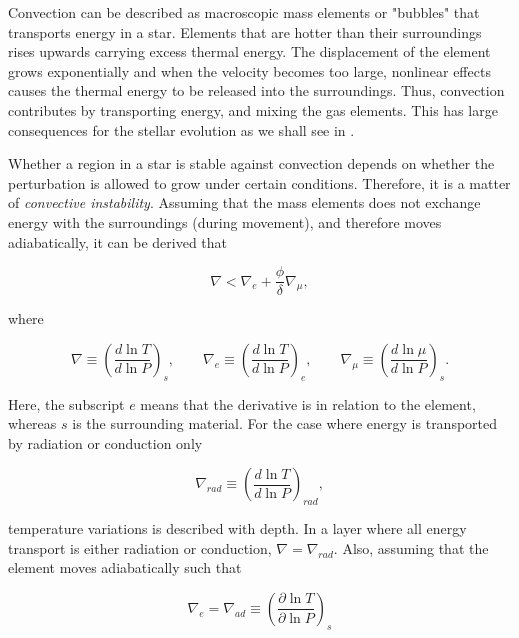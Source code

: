 Convection can be described as macroscopic mass elements or "bubbles" that transports energy in a star. Elements that are hotter than their surroundings rises upwards carrying excess thermal energy. The displacement of the element grows exponentially and when the velocity becomes too large, nonlinear effects causes the thermal energy to be released into the surroundings. Thus, convection contributes by transporting energy, and mixing the gas elements. This has large consequences for the stellar evolution as we shall see in . 

Whether a region in a star is stable against convection depends on whether the perturbation is allowed to grow under certain conditions. Therefore, it is a matter of \textit{convective instability}. Assuming that the mass elements does not exchange energy with the surroundings (during movement), and therefore moves adiabatically, it can be derived that 

\begin{equation}
\label{instability_eq}
    \nabla < \nabla_e + \frac{\phi}{\delta}\nabla_{\mu},
\end{equation}

\noindent where

\begin{equation}
    \nabla \equiv \left(\frac{d \ln T}{d \ln P}\right)_s, \qquad \nabla_e \equiv \left(\frac{d \ln T}{d \ln P}\right)_e, \qquad \nabla_\mu \equiv \left(\frac{d \ln \mu}{d \ln P}\right)_s.
\end{equation}

\noindent Here, the subscript $e$ means that the derivative is in relation to the element, whereas $s$ is the surrounding material. %
For the case where energy is transported by radiation or conduction only

\begin{equation}
    \nabla_{rad} \equiv \left(\frac{d \ln T}{d \ln P}\right)_{rad}, 
\end{equation}

\noindent temperature variations is described with depth. In a layer where all energy transport is either radiation or conduction, $\nabla = \nabla_{rad}$. Also, assuming that the element moves adiabatically such that 

\begin{equation}
\label{stability}
    \nabla_e = \nabla_{ad} \equiv \left(\frac{\partial \ln T}{\partial \ln P}\right)_s
\end{equation}

